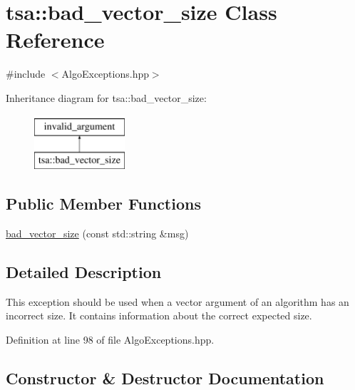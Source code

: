\hypertarget{classtsa_1_1bad__vector__size}{}\section{tsa\+:\+:bad\+\_\+vector\+\_\+size Class Reference}
\label{classtsa_1_1bad__vector__size}


{\ttfamily \#include $<$Algo\+Exceptions.\+hpp$>$}

Inheritance diagram for tsa\+:\+:bad\+\_\+vector\+\_\+size\+:\begin{figure}[H]
\begin{center}
\leavevmode
\includegraphics[height=2.000000cm]{classtsa_1_1bad__vector__size}
\end{center}
\end{figure}
\subsection*{Public Member Functions}
\begin{DoxyCompactItemize}
\item 
\hyperlink{classtsa_1_1bad__vector__size_a9ec1fb1fd91fdd191f8dfd59b51beb7a}{bad\+\_\+vector\+\_\+size} (const std\+::string \&msg)
\end{DoxyCompactItemize}


\subsection{Detailed Description}
This exception should be used when a vector argument of an algorithm has an incorrect size. It contains information about the correct expected size. 

Definition at line 98 of file Algo\+Exceptions.\+hpp.



\subsection{Constructor \& Destructor Documentation}
\mbox{\label{classtsa_1_1bad__vector__size_a9ec1fb1fd91fdd191f8dfd59b51beb7a}} 
